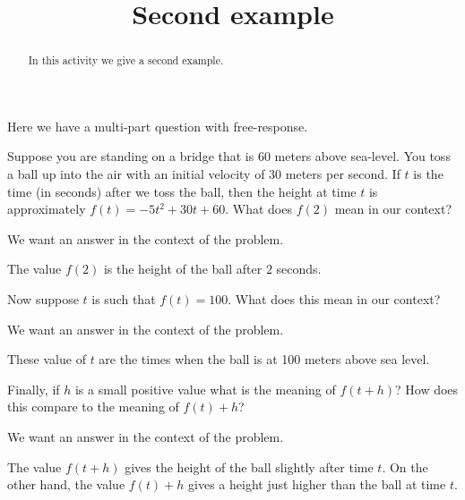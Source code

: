 \documentclass{ximera}
\title{Second example}
\begin{document}
\begin{abstract}
In this activity we give a second example.
\end{abstract} 
\maketitle

Here we have a multi-part question with free-response.

\begin{question} 
Suppose you are standing on a bridge that is 60 meters above
sea-level. You toss a ball up into the air with an initial velocity of
30 meters per second.  If $t$ is the time (in seconds) after we toss
the ball, then the height at time $t$ is approximately $f(t) = -5 t^2
+30t+60$. What does $f(2)$ mean in our context?
\begin{solution}
\begin{hint}
We want an answer in the context of the problem. 
\end{hint}
\begin{freeResponse}
The value $f(2)$ is the height of the ball after $2$ seconds.
\end{freeResponse}
\end{solution}
Now suppose $t$ is such that $f(t) = 100$. What does this mean in our
context?
\begin{solution}
\begin{hint}
We want an answer in the context of the problem. 
\end{hint}
\begin{freeResponse}
These value of $t$ are the times when the ball is at 100 meters above sea level.\end{freeResponse}
\end{solution}
Finally, if $h$ is a small positive value what is the meaning of
$f(t+h)$? How does this compare to the meaning of $f(t)+h$?
\begin{solution}
\begin{hint}
We want an answer in the context of the problem. 
\end{hint}
\begin{freeResponse}
The value $f(t+h)$ gives the height of the ball slightly after time
$t$. On the other hand, the value $f(t)+h$ gives a height just higher
than the ball at time $t$.
\end{freeResponse}
\end{solution}
\end{question}
\end{document}
